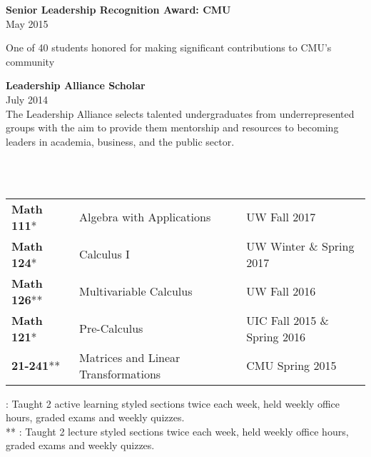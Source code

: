 \documentclass[12 pt]{article}
\newcommand{\lineunder}{\vspace*{-8pt} \\ \hspace*{-18pt} \hrulefill \\}
\newcommand{\header}[1]{{\hspace*{-15pt}\vspace*{6pt} \selectfont{\textsc{#1}}} \vspace*{-6pt} \lineunder}
\newenvironment{achievements}{\begin{list}{$\bullet$}{\topsep 0pt \itemsep -2pt}}{\vspace*{4pt}\end{list}}
\begin{document}
\textbf{Senior Leadership Recognition Award: CMU }\\

May 2015\\
\smallskip

One of 40 students honored for making significant contributions to CMU's community 
\bigskip

\textbf{Leadership Alliance Scholar}\\
July 2014\\
\smallskip
The Leadership Alliance selects talented undergraduates from underrepresented groups with the aim to
provide them mentorship and resources to becoming leaders in academia, business, and the public sector. 
\bigskip



\header{Teaching}

\begin{center}
	\begin{tabular}{ l l l }
	  \textbf{Math 111}*& Algebra with Applications & UW Fall 2017 \\ 
	  \textbf{Math 124}*&	 Calculus I & UW Winter  \& Spring 2017  \\  
	 \textbf{Math 126}** &    Multivariable Calculus   & UW Fall 2016    \\
	\textbf{Math 121}*	& Pre-Calculus	& UIC Fall 2015 \& Spring 2016\\	
	\textbf{21-241}**	&	Matrices and Linear Transformations & CMU Spring 2015 	
	\end{tabular}
\end{center}
\smallskip
{\scriptsize * : Taught 2 active learning styled sections twice each week,
 held weekly office hours, graded exams and weekly quizzes. \\
** : Taught 2 lecture styled sections twice each week, held weekly office hours, graded exams and weekly quizzes.} \\


\bigskip

\end{document}
